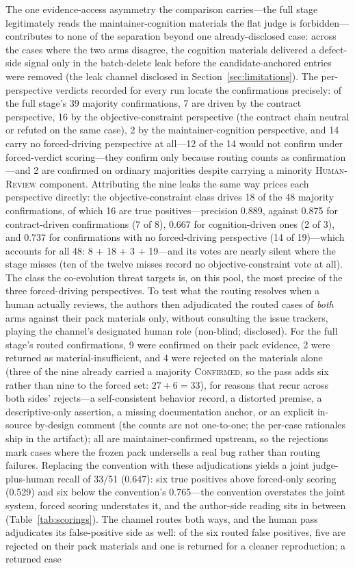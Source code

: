 \documentclass[acmsmall,screen,review,anonymous]{acmart}
\begin{document}
The one evidence-access asymmetry the comparison carries---the full stage legitimately reads the maintainer-cognition materials the flat judge is forbidden---contributes to none of the separation beyond one already-disclosed case: across the cases where the two arms disagree, the cognition materials delivered a defect-side signal only in the batch-delete leak before the candidate-anchored entries were removed (the leak channel disclosed in Section~\ref{sec:limitations}). The per-perspective verdicts recorded for every run locate the confirmations precisely: of the full stage's 39 majority confirmations, 7 are driven by the contract perspective, 16 by the objective-constraint perspective (the contract chain neutral or refuted on the same case), 2 by the maintainer-cognition perspective, and 14 carry no forced-driving perspective at all---12 of the 14 would not confirm under forced-verdict scoring---they confirm only because routing counts as confirmation---and 2 are confirmed on ordinary majorities despite carrying a minority \textsc{Human-Review} component. Attributing the nine leaks the same way prices each perspective directly: the objective-constraint class drives 18 of the 48 majority confirmations, of which 16 are true positives---precision 0.889, against 0.875 for contract-driven confirmations (7 of 8), 0.667 for cognition-driven ones (2 of 3), and 0.737 for confirmations with no forced-driving perspective (14 of 19)---which accounts for all 48: 8 + 18 + 3 + 19---and its votes are nearly silent where the stage misses (ten of the twelve misses record no objective-constraint vote at all). The class the co-evolution threat targets is, on this pool, the most precise of the three forced-driving perspectives. To test what the routing resolves when a human actually reviews, the authors then adjudicated the routed cases of \emph{both} arms against their pack materials only, without consulting the issue trackers, playing the channel's designated human role (non-blind; disclosed). For the full stage's routed confirmations, 9 were confirmed on their pack evidence, 2 were returned as material-insufficient, and 4 were rejected on the materials alone (three of the nine already carried a majority \textsc{Confirmed}, so the pass adds six rather than nine to the forced set: $27 + 6 = 33$), for reasons that recur across both sides' rejects---a self-consistent behavior record, a distorted premise, a descriptive-only assertion, a missing documentation anchor, or an explicit in-source by-design comment (the counts are not one-to-one; the per-case rationales ship in the artifact); all are maintainer-confirmed upstream, so the rejections mark cases where the frozen pack undersells a real bug rather than routing failures. Replacing the convention with these adjudications yields a joint judge-plus-human recall of 33/51 (0.647): six true positives above forced-only scoring (0.529) and six below the convention's 0.765---the convention overstates the joint system, forced scoring understates it, and the author-side reading sits in between (Table~\ref{tab:scorings}). The channel routes both ways, and the human pass adjudicates its false-positive side as well: of the six routed false positives, five are rejected on their pack materials and one is returned for a cleaner reproduction; a returned case 
\end{document}

